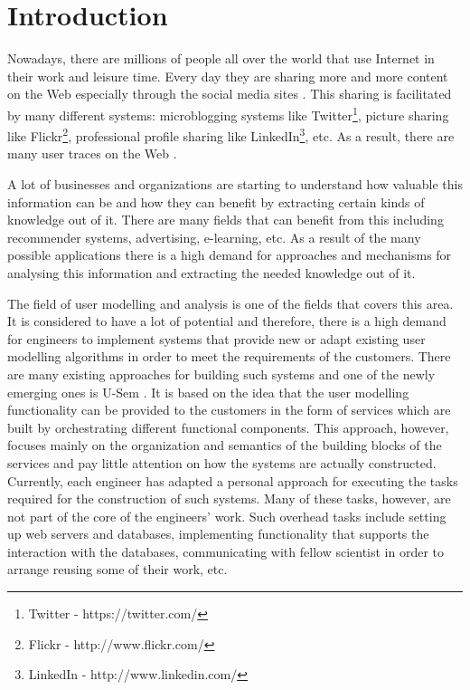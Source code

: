 
\chapter{\label{cha:intro}Introduction}

Nowadays, there are millions of people all over the world that use Internet in their work and leisure time. Every day they are sharing more and more content on the Web especially through the social media sites \cite{kaplan2010users}. This sharing is facilitated by many different systems: microblogging systems like Twitter\footnote{Twitter - https://twitter.com/}, picture sharing like Flickr\footnote{Flickr - http://www.flickr.com/}, professional profile sharing like LinkedIn\footnote{LinkedIn - http://www.linkedin.com/}, etc. As a result, there are many user traces on the Web \cite{abel2010interweaving}.

A lot of businesses and organizations are starting to understand how valuable this information can be and how they can benefit by extracting certain kinds of knowledge out of it. There are many fields that can benefit from this including recommender systems, advertising, e-learning, etc. As a result of the many possible applications there is a high demand for approaches and mechanisms for analysing this information and extracting the needed knowledge out of it. 

The field of user modelling and analysis is one of the fields that covers this area. It is considered to have a lot of potential \cite{brusilovsky2007adaptive} and therefore, there is a high demand for engineers to implement systems that provide new or adapt existing user modelling algorithms in order to meet the requirements of the customers. There are many existing approaches for building such systems \cite{kobsa2001generic} and one of the newly emerging ones is U-Sem \cite{abel2011u}. It is based on the idea that the user modelling functionality can be provided to the customers in the form of services which are built by orchestrating different functional components. This approach, however, focuses mainly on the organization and semantics of the building blocks of the services and pay little attention on how the systems are actually constructed. Currently, each engineer has adapted a personal approach for executing the tasks required for the construction of such systems. Many of these tasks, however, are not part of the core of the engineers' work. Such overhead tasks include setting up web servers and databases, implementing functionality that supports the interaction with the databases, communicating with fellow scientist in order to arrange reusing some of their work, etc. 

